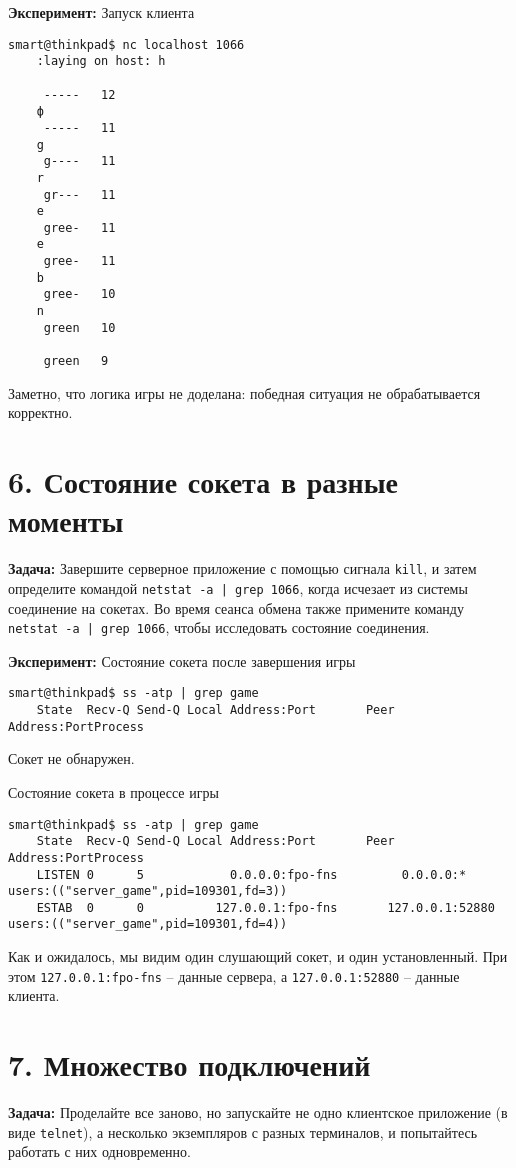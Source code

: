 \textbf{Эксперимент:} Запуск клиента
\begin{Verbatim}[frame=single,breaklines=true,breakanywhere=true]
    smart@thinkpad$ nc localhost 1066
    :laying on host: h
    
     -----   12
    ф
     -----   11
    g
     g----   11
    r
     gr---   11
    e
     gree-   11
    e
     gree-   11
    b
     gree-   10
    n
     green   10
    
     green   9
\end{Verbatim}

Заметно, что логика игры не доделана: победная ситуация не обрабатывается корректно.

\section*{6. Состояние сокета в разные моменты}
\textbf{Задача:} Завершите серверное приложение с помощью сигнала \texttt{kill}, и затем определите командой \texttt{netstat -a | grep 1066}, когда исчезает из системы соединение на сокетах. Во время сеанса обмена также примените команду \texttt{netstat -a | grep 1066}, чтобы исследовать состояние соединения.

\textbf{Эксперимент:} Состояние сокета после завершения игры
\begin{Verbatim}[frame=single,breaklines=true,breakanywhere=true]
    smart@thinkpad$ ss -atp | grep game
    State  Recv-Q Send-Q Local Address:Port       Peer Address:PortProcess
\end{Verbatim}
Сокет не обнаружен.

Состояние сокета в процессе игры
\begin{Verbatim}[frame=single,breaklines=true,breakanywhere=true]
    smart@thinkpad$ ss -atp | grep game
    State  Recv-Q Send-Q Local Address:Port       Peer Address:PortProcess
    LISTEN 0      5            0.0.0.0:fpo-fns         0.0.0.0:*         users:(("server_game",pid=109301,fd=3))
    ESTAB  0      0          127.0.0.1:fpo-fns       127.0.0.1:52880     users:(("server_game",pid=109301,fd=4))
\end{Verbatim}
Как и ожидалось, мы видим один слушающий сокет, и один установленный. При этом \texttt{127.0.0.1:fpo-fns} -- данные сервера, а \texttt{127.0.0.1:52880} -- данные клиента.

\section*{7. Множество подключений}
\textbf{Задача:} Проделайте все заново, но запускайте не одно клиентское приложение (в виде \texttt{telnet}), а несколько экземпляров с разных терминалов, и попытайтесь работать с них одновременно.

